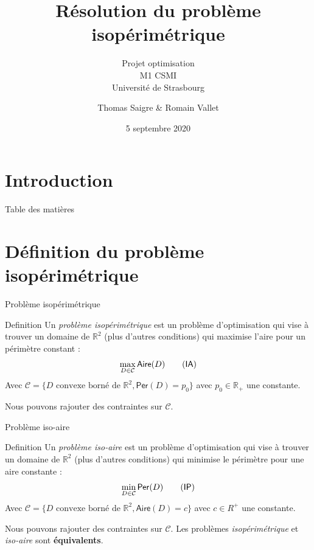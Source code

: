 \documentclass[11pt,envcountsect,aspectratio=169]{beamer} %
\author[Thomas S. \& Romain V.]{Thomas Saigre \& Romain Vallet}
\title{Résolution du problème isopérimétrique}
\subtitle{Projet optimisation \\ M1 CSMI \\ Université de Strasbourg}
\date{5 septembre 2020}  %
\newcommand{\frametitre}{\begin{frame}
    \begin{center}
    {\Large\bf \secname}
    \end{center}
    \end{frame}
}
\newcommand{\R}{\mathbb{R}}
\newcommand{\C}{\mathcal{C}}
\newcommand{\A}{\mathsf{Aire}}
\newcommand{\p}{\mathsf{Per}}
\newcommand{\IA}{\textsf{IA}}
\newcommand{\IP}{\textsf{IP}}
\begin{document}
\begin{frame}[plain]
\titlepage
\end{frame}


\section[Introduction]{Introduction}




\begin{frame}{Table des matières}
\tableofcontents[hideallsubsections]
\end{frame}




\section{Définition du problème isopérimétrique}

\begin{frame}{Problème isopérimétrique}

\begin{beamerboxesrounded}[upper=titreB,lower=texteB,shadow=true]{Definition}
        Un \emph{problème isopérimétrique} est un problème d'optimisation qui vise à trouver un domaine de $\R^2$ (plus d'autres conditions) qui maximise l'aire pour un périmètre constant :
        \[\max_{D \in \C} \A(D) \label{ia}\tag{\IA}\]
        Avec $\mathcal{C} = \{ D \text{ convexe borné de } \R^2, \p(D) = p_0 \}$ avec $p_0 \in \R_+$ une constante.
\end{beamerboxesrounded}

Nous pouvons rajouter des contraintes sur $\C$.

\end{frame}

\begin{frame}{Problème iso-aire}

\begin{beamerboxesrounded}[upper=titreB,lower=texteB,shadow=true]{Definition}
        Un \emph{problème iso-aire} est un problème d'optimisation qui vise à trouver un domaine de $\R^2$ (plus d'autres conditions) qui minimise le périmètre pour une aire constante :
        \[\min_{D \in \C} \p(D) \label{ip}\tag{\IP}\]
        Avec $\mathcal{C} = \{ D \text{ convexe borné de } \R^2, \A(D)=c \}$ avec $c \in R^+$ une constante.
\end{beamerboxesrounded}

Nous pouvons rajouter des contraintes sur $\C$.
Les problèmes \emph{isopérimétrique} et \emph{iso-aire} sont \textbf{équivalents}.

\end{frame}
\end{document}
